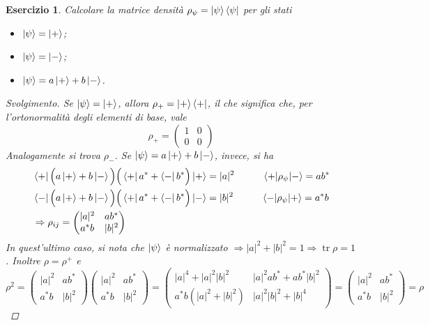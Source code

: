\documentclass[11pt, a4paper]{scrartcl} %
\numberwithin{equation}{subsection}
\theoremstyle{style2}
\theoremstyle{style1}
\newtheorem{esercizio}{Esercizio}[section]
\renewcommand\qedsymbol{$\blacksquare$}
\newenvironment{svolgimento}{\renewcommand\qedsymbol{$\spadesuit$}\begin{proof}[Svolgimento]}{\end{proof}}
\begin{document}
\begin{esercizio}
	Calcolare la matrice densit\`a $\rho _\psi =  \ket{\psi } \bra{\psi }  $ per gli stati
	\begin{itemize}
		\item $\ket{\psi } = \ket{+} $;
		\item $\ket{\psi } = \ket{-} $;
		\item $\ket{\psi } = a \ket{+} + b \ket{-} $.
	\end{itemize}
	\begin{svolgimento}
		Se $\ket{\psi } = \ket{+} $, allora $\rho _+ = \ket{+} \bra{+} $, il che significa che, per l'ortonormalit\`a degli elementi di base, vale 
		\[
			\rho _+=\begin{pmatrix} 1 & 0 \\ 0 &0 \end{pmatrix} 
		\] 
		Analogamente si trova $\rho _-$. 
		Se $\ket{\psi } = a \ket{+}  + b \ket{-} $, invece, si ha
		\[
			\begin{split}
				&\bra{+} \Big(a \ket{+} + b \ket{-} \Big) \Big(\bra{+} a^* + \bra{-} b^*\Big) \ket{+}  = \lvert a \rvert ^2 \hspace{1cm}\braket{+|\rho _\psi |-} = ab^* \\
				&\bra{-} \Big(a \ket{+} + b \ket{-} \Big) \Big(\bra{+} a^* + \bra{-} b^*\Big) \ket{-}  = \lvert b \rvert ^2\hspace{1cm} \braket{-|\rho _\psi |+} = a^* b\\
				&\Rightarrow \rho _{ij} = \begin{pmatrix} \lvert a \rvert ^2 & ab^* \\ a^* b  & \lvert b \rvert ^2 \end{pmatrix} 
			\end{split}
		\] 
		In quest'ultimo caso, si nota che  $\ket{\psi } $ \`e normalizzato $\Rightarrow \lvert a \rvert ^2 + \lvert b \rvert ^2 = 1\Rightarrow  \operatorname{tr} \rho =  1$. 
		Inoltre $\rho = \rho ^+$ e 
		\[
			\rho ^2 = \begin{pmatrix} \lvert a \rvert ^2 & ab^* \\ a^* b& \lvert b \rvert ^2 \end{pmatrix} \begin{pmatrix} \lvert a \rvert ^2 & ab^* \\ a^* b& \lvert b \rvert ^2 \end{pmatrix} = \begin{pmatrix} \lvert a \rvert ^4 + \lvert a \rvert ^2 \lvert b \rvert ^2 & \lvert a \rvert ^2 ab^* + ab^* \lvert b \rvert ^2 \\ a^* b \left(\lvert a \rvert ^2 + \lvert b \rvert ^2\right) & \lvert a \rvert ^2  \lvert b \rvert ^2 + \lvert b \rvert ^4\end{pmatrix} = \begin{pmatrix} \lvert a \rvert ^2 & ab^* \\ a^* b & \lvert b \rvert ^2 \end{pmatrix} = \rho 
		\] 
	\end{svolgimento}
\end{esercizio}
\end{document}
